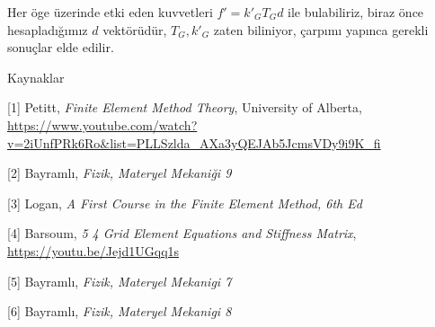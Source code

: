 \documentclass[12pt,fleqn]{article}\usepackage{../../common}
\begin{document}
Her öge üzerinde etki eden kuvvetleri $f' = k'_G T_G d$ ile bulabiliriz, biraz
önce hesapladığımız $d$ vektörüdür, $T_G,k'_G$ zaten biliniyor, çarpımı yapınca
gerekli sonuçlar elde edilir.

Kaynaklar

[1] Petitt, {\em Finite Element Method Theory}, University of Alberta,
    \url{https://www.youtube.com/watch?v=2iUnfPRk6Ro&list=PLLSzlda_AXa3yQEJAb5JcmsVDy9i9K_fi}

[2] Bayramlı, {\em Fizik, Materyel Mekaniği 9}

[3] Logan, {\em A First Course in the Finite Element Method, 6th Ed}

[4] Barsoum, {\em 5 4 Grid Element Equations and Stiffness Matrix},
    \url{https://youtu.be/Jejd1UGqq1s}

[5] Bayramlı, {\em Fizik, Materyel Mekanigi 7}

[6] Bayramlı, {\em Fizik, Materyel Mekanigi 8}
\end{document}
